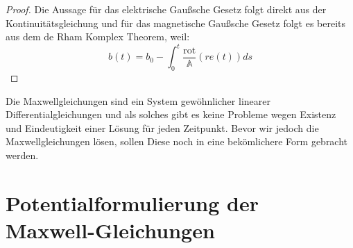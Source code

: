 \documentclass[11pt,a4paper,leqno]{report}
\numberwithin{equation}{chapter}
\begin{document}
\begin{proof}
	Die Aussage für das elektrische Gaußsche Gesetz folgt direkt aus der Kontinuitätsgleichung und für das magnetische Gaußsche Gesetz folgt es bereits aus dem de Rham Komplex Theorem, weil:
	\[
	b(t) = b_0 - \int_0^t\frac{\mathrm{rot}}{\mathbb{A}}(r e(t)) ds 
	\]
\end{proof}
\noindent
Die Maxwellgleichungen sind ein System gew\"ohnlicher linearer Differentialgleichungen und als solches gibt es keine Probleme wegen Existenz und Eindeutigkeit einer L\"osung f\"ur jeden Zeitpunkt. Bevor wir jedoch die Maxwellgleichungen l\"osen, sollen Diese noch in eine bek\"omlichere Form gebracht werden.
\section{Potentialformulierung der Maxwell-Gleichungen}
\end{document}

